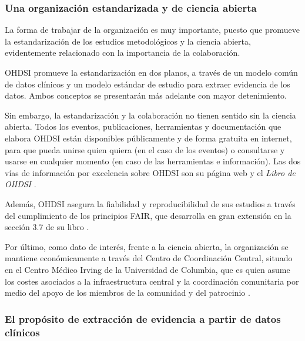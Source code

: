 
\subsubsection{Una organización estandarizada y de ciencia abierta}

La forma de trabajar de la organización es muy importante, puesto que promueve la estandarización de los estudios metodológicos y la ciencia abierta, evidentemente relacionado con la importancia de la colaboración.

OHDSI promueve la estandarización en dos planos, a través de un modelo común de datos clínicos y un modelo estándar de estudio para extraer evidencia de los datos. Ambos conceptos se presentarán más adelante con mayor detenimiento.

Sin embargo, la estandarización y la colaboración no tienen sentido sin la ciencia abierta. Todos los eventos, publicaciones, herramientas y documentación que elabora OHDSI están disponibles públicamente y de forma gratuita en internet, para que pueda unirse quien quiera (en el caso de los eventos) o consultarse y usarse en cualquier momento (en caso de las herramientas e información). Las dos vías de información por excelencia sobre OHDSI son su página web \cite{OHDSIwebsite} y el \textit{Libro de OHDSI} \cite{OHDSIbook}.

Además, OHDSI asegura la fiabilidad y reproducibilidad de sus estudios a través del cumplimiento de los principios FAIR, que desarrolla en gran extensión en la sección 3.7 de su libro \cite{OHDSIbook}.
    
Por último, como dato de interés, frente a la ciencia abierta, la organización se mantiene económicamente a través del Centro de Coordinación Central, situado en el Centro Médico Irving de la Universidad de Columbia, que es quien asume los costes asociados a la infraestructura central y la coordinación comunitaria por medio del apoyo de los miembros de la comunidad y del patrocinio \cite{OHDSIwebsite}.

\subsubsection{El propósito de extracción de evidencia a partir de datos clínicos}

